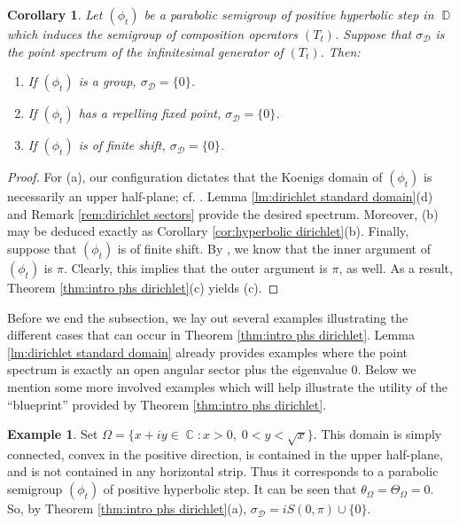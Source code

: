 \documentclass[11pt]{amsart}
\numberwithin{equation}{section}
\newtheorem{corollary}[theorem]{Corollary}
\theoremstyle{definition}
\newtheorem{example}[theorem]{Example}
\DeclareMathOperator{\C}{\mathbb{C}}
\DeclareMathOperator{\D}{\mathbb{D}}
\begin{document}
	\begin{corollary}\label{cor:phs dirichlet}
		Let $(\phi_t)$ be a parabolic semigroup of positive hyperbolic step in $\D$ which induces the semigroup of composition operators $(T_t)$. Suppose that $\sigma_\mathcal{D}$ is the point spectrum of the infinitesimal generator of $(T_t)$. Then:
		\begin{enumerate}
			\item[\textup{(a)}] If $(\phi_t)$ is a group, $\sigma_\mathcal{D}=\{0\}$.
			\item[\textup{(b)}] If $(\phi_t)$ has a repelling fixed point, $\sigma_\mathcal{D}=\{0\}$.
			\item[\textup{(c)}] If $(\phi_t)$ is of finite shift, $\sigma_\mathcal{D}=\{0\}$. 
		\end{enumerate}
	\end{corollary}
	\begin{proof}
		For (a), our configuration dictates that the Koenigs domain of $(\phi_t)$ is necessarily an upper half-plane; cf. \cite[Proposition 9.3.12]{Booksem}. Lemma \ref{lm:dirichlet standard domain}(d) and Remark \ref{rem:dirichlet sectors} provide the desired spectrum. Moreover, (b) may be deduced exactly as Corollary \ref{cor:hyperbolic dirichlet}(b). Finally, suppose that $(\phi_t)$ is of finite shift. By \cite[Proposition 3.2]{our_finiteshift}, we know that the inner argument of $(\phi_t)$ is $\pi$. Clearly, this implies that the outer argument is $\pi$, as well. As a result, Theorem \ref{thm:intro phs dirichlet}(c) yields (c).
	\end{proof}
	
	Before we end the subsection, we lay out several examples illustrating the different cases that can occur in Theorem \ref{thm:intro phs dirichlet}. Lemma \ref{lm:dirichlet standard domain} already provides examples where the point spectrum is exactly an open angular sector plus the eigenvalue $0$. Below we mention some more involved examples which will help illustrate the utility of the ``blueprint'' provided by Theorem \ref{thm:intro phs dirichlet}.
	
	\begin{example}
		Set $\Omega=\{x+iy\in\C:x>0, \;0<y<\sqrt{x}\}$. This domain is simply connected, convex in the positive direction, is contained in the upper half-plane, and is not contained in any horizontal strip. Thus it corresponds to a parabolic semigroup $(\phi_t)$ of positive hyperbolic step. It can be seen that $\theta_\Omega=\Theta_\Omega=0$. So, by Theorem \ref{thm:intro phs dirichlet}(a), $\sigma_\mathcal{D}=iS(0,\pi)\cup\{0\}$.
	\end{example}
	
\end{document}
